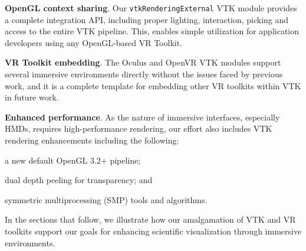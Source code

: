 \textbf{OpenGL context sharing}.
Our \texttt{vtkRenderingExternal} VTK module provides a complete integration API,
including proper lighting, interaction, picking and access to the entire
VTK pipeline.
This, enables simple utilization for application developers using
any OpenGL-based VR Toolkit.

\textbf{VR Toolkit embedding}.
The Oculus and OpenVR VTK modules support several immersive environments directly
without the issues faced by previous work, and it is a complete template
for embedding other VR toolkits within VTK in future work.

\textbf{Enhanced performance}.
As the nature of immersive interfaces, especially HMDs, requires
high-performance rendering, our effort also includes VTK rendering enhancements
including the following:

\begin{compactitem}
\item a new default OpenGL 3.2+ pipeline;
\item dual depth peeling for transparency; and 
\item symmetric multiprocessing (SMP) tools and algorithms.
\end{compactitem}

In the sections that follow, we illustrate how our amalgamation of VTK and VR toolkits support our goals for enhancing scientific visualization through immersive environments.


